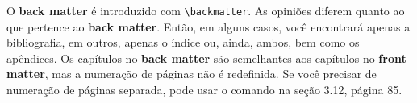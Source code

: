 O \textbf{back matter} é introduzido com \verb|\backmatter|. As opiniões diferem quanto ao que pertence ao \textbf{back matter}. Então, em alguns casos, você encontrará apenas a bibliografia, em outros, apenas o índice ou, ainda, ambos, bem como os apêndices. Os capítulos no\textbf{ back matter} são semelhantes aos capítulos no\textbf{ front matter}, mas a numeração de páginas não é redefinida. Se você precisar de numeração de páginas separada, pode usar o comando  na seção 3.12, página 85.
